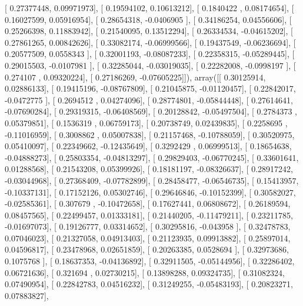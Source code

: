 \documentclass{article}
\begin{document}
       [ 0.27377448,  0.09971973],
       [ 0.19594102,  0.10613212],
       [ 0.1840422 ,  0.08174654],
       [ 0.16027599,  0.05916954],
       [ 0.28654318, -0.0406905 ],
       [ 0.34186254,  0.04556606],
       [ 0.25266398,  0.11883942],
       [ 0.21540095,  0.13512294],
       [ 0.26334534, -0.04615202],
       [ 0.27861265,  0.00842626],
       [ 0.33082174, -0.06999566],
       [ 0.19437549, -0.06236694],
       [ 0.20577509,  0.0558343 ],
       [ 0.32001193, -0.08087233],
       [ 0.22358315, -0.05289445],
       [ 0.29015503, -0.0107981 ],
       [ 0.32285044, -0.03019035],
       [ 0.22282008, -0.0998197 ],
       [ 0.274107  ,  0.09320224],
       [ 0.27186269, -0.07605225]]), array([[ 0.30125914,  0.02886133],
       [ 0.19415196, -0.08767809],
       [ 0.21045875, -0.01120457],
       [ 0.22842017, -0.0472775 ],
       [ 0.2694512 ,  0.04274096],
       [ 0.28774801, -0.05844448],
       [ 0.27614641, -0.07690284],
       [ 0.29319315, -0.06408569],
       [ 0.20128842, -0.05497504],
       [ 0.2784373 ,  0.05379851],
       [ 0.1536319 ,  0.06759173],
       [ 0.20738749,  0.02439835],
       [ 0.2258695 , -0.11016959],
       [ 0.3008862 ,  0.05007838],
       [ 0.21157468, -0.10788059],
       [ 0.30520975,  0.05410097],
       [ 0.22349662, -0.12435649],
       [ 0.3292429 ,  0.06999513],
       [ 0.18654638, -0.04888273],
       [ 0.25803354, -0.04813297],
       [ 0.29829403, -0.06770245],
       [ 0.33601641,  0.01288568],
       [ 0.21543208,  0.05399926],
       [ 0.18181197, -0.08326637],
       [ 0.28917242, -0.03044968],
       [ 0.27368409, -0.07782899],
       [ 0.28458477, -0.06546735],
       [ 0.15413957, -0.10337131],
       [ 0.17152126,  0.05302746],
       [ 0.29646846, -0.10152399],
       [ 0.30582027, -0.02585361],
       [ 0.307679  , -0.10472658],
       [ 0.17627441,  0.06808672],
       [ 0.26189594,  0.08457565],
       [ 0.22499457,  0.01333181],
       [ 0.21440205, -0.11479211],
       [ 0.23211785, -0.01697073],
       [ 0.19126777,  0.03314652],
       [ 0.30295816, -0.043958  ],
       [ 0.32478783,  0.07046023],
       [ 0.21327058,  0.04913403],
       [ 0.21123935,  0.09913882],
       [ 0.25897014,  0.04596817],
       [ 0.23478968,  0.02651859],
       [ 0.20263385,  0.0528694 ],
       [ 0.32973686,  0.1075768 ],
       [ 0.18637353, -0.04136892],
       [ 0.32911505, -0.05144956],
       [ 0.32286402,  0.06721636],
       [ 0.321694  ,  0.02730215],
       [ 0.13898288,  0.09324735],
       [ 0.31082324,  0.07490954],
       [ 0.22842783,  0.04516232],
       [ 0.31249255, -0.05483193],
       [ 0.20823271,  0.07883827],
\end{document}
